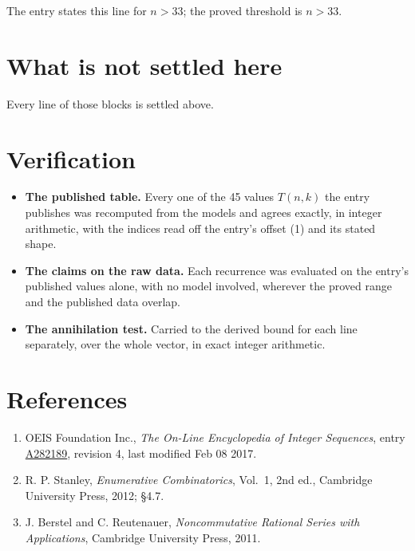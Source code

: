 \documentclass[11pt]{article}
\theoremstyle{definition}
\begin{document}
The entry states this line for $n > 33$; the proved threshold is $n > 33$.

\section{What is not settled here}

Every line of those blocks is settled above.

\section{Verification}

\begin{itemize}

\item {\bfseries The published table.} Every one of the 45 values $T(n,k)$ the entry publishes was recomputed from the models and agrees exactly, in integer arithmetic, with the indices read off the entry's offset (1) and its stated shape.

\item {\bfseries The claims on the raw data.} Each recurrence was evaluated on the entry's published values alone, with no model involved, wherever the proved range and the published data overlap.

\item {\bfseries The annihilation test.} Carried to the derived bound for each line separately, over the whole vector, in exact integer arithmetic.

\end{itemize}

\section{References}

\begin{enumerate}

\item OEIS Foundation Inc., \emph{The On-Line Encyclopedia of Integer Sequences}, entry \href{https://oeis.org/A282189}{A282189}, revision 4, last modified Feb 08 2017.

\item R. P. Stanley, \emph{Enumerative Combinatorics}, Vol.~1, 2nd ed., Cambridge University Press, 2012; \S4.7.

\item J. Berstel and C. Reutenauer, \emph{Noncommutative Rational Series with Applications}, Cambridge University Press, 2011.

\end{enumerate}
\end{document}
